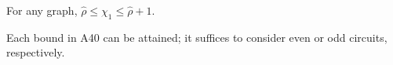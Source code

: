 For any graph, $\hat{\rho} \leq \chi_1 \leq \hat{\rho} + 1.$

Each bound in A40 can be attained; it suffices to consider even or odd circuits, respectively.
